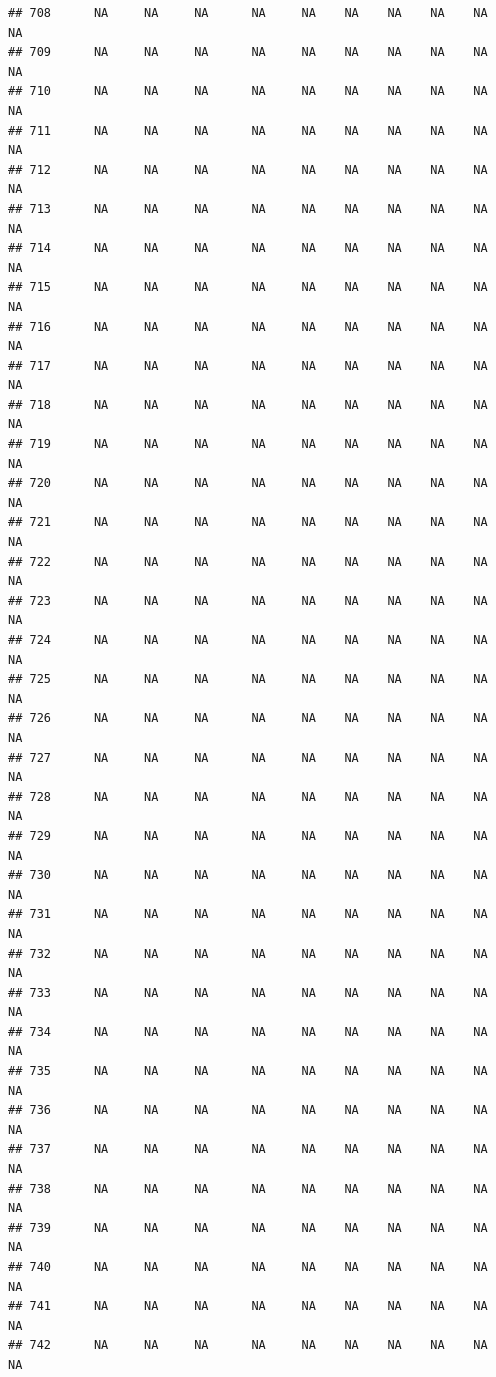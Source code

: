 \documentclass{article}\usepackage{graphicx, color}
\makeatletter
\newenvironment{kframe}{%
 \def\at@end@of@kframe{}%
 \ifinner\ifhmode%
  \def\at@end@of@kframe{\end{minipage}}%
  \begin{minipage}{\columnwidth}%
 \fi\fi%
 \def\FrameCommand##1{\hskip\@totalleftmargin \hskip-\fboxsep
 \colorbox{shadecolor}{##1}\hskip-\fboxsep
     \hskip-\linewidth \hskip-\@totalleftmargin \hskip\columnwidth}%
 \MakeFramed {\advance\hsize-\width
   \@totalleftmargin\z@ \linewidth\hsize
   \@setminipage}}%
 {\par\unskip\endMakeFramed%
 \at@end@of@kframe}
\newenvironment{knitrout}{}{} %
\makeatother
\begin{document}
\begin{knitrout}
\begin{kframe}
\begin{verbatim}
## 708      NA     NA     NA      NA     NA    NA    NA    NA    NA     NA
## 709      NA     NA     NA      NA     NA    NA    NA    NA    NA     NA
## 710      NA     NA     NA      NA     NA    NA    NA    NA    NA     NA
## 711      NA     NA     NA      NA     NA    NA    NA    NA    NA     NA
## 712      NA     NA     NA      NA     NA    NA    NA    NA    NA     NA
## 713      NA     NA     NA      NA     NA    NA    NA    NA    NA     NA
## 714      NA     NA     NA      NA     NA    NA    NA    NA    NA     NA
## 715      NA     NA     NA      NA     NA    NA    NA    NA    NA     NA
## 716      NA     NA     NA      NA     NA    NA    NA    NA    NA     NA
## 717      NA     NA     NA      NA     NA    NA    NA    NA    NA     NA
## 718      NA     NA     NA      NA     NA    NA    NA    NA    NA     NA
## 719      NA     NA     NA      NA     NA    NA    NA    NA    NA     NA
## 720      NA     NA     NA      NA     NA    NA    NA    NA    NA     NA
## 721      NA     NA     NA      NA     NA    NA    NA    NA    NA     NA
## 722      NA     NA     NA      NA     NA    NA    NA    NA    NA     NA
## 723      NA     NA     NA      NA     NA    NA    NA    NA    NA     NA
## 724      NA     NA     NA      NA     NA    NA    NA    NA    NA     NA
## 725      NA     NA     NA      NA     NA    NA    NA    NA    NA     NA
## 726      NA     NA     NA      NA     NA    NA    NA    NA    NA     NA
## 727      NA     NA     NA      NA     NA    NA    NA    NA    NA     NA
## 728      NA     NA     NA      NA     NA    NA    NA    NA    NA     NA
## 729      NA     NA     NA      NA     NA    NA    NA    NA    NA     NA
## 730      NA     NA     NA      NA     NA    NA    NA    NA    NA     NA
## 731      NA     NA     NA      NA     NA    NA    NA    NA    NA     NA
## 732      NA     NA     NA      NA     NA    NA    NA    NA    NA     NA
## 733      NA     NA     NA      NA     NA    NA    NA    NA    NA     NA
## 734      NA     NA     NA      NA     NA    NA    NA    NA    NA     NA
## 735      NA     NA     NA      NA     NA    NA    NA    NA    NA     NA
## 736      NA     NA     NA      NA     NA    NA    NA    NA    NA     NA
## 737      NA     NA     NA      NA     NA    NA    NA    NA    NA     NA
## 738      NA     NA     NA      NA     NA    NA    NA    NA    NA     NA
## 739      NA     NA     NA      NA     NA    NA    NA    NA    NA     NA
## 740      NA     NA     NA      NA     NA    NA    NA    NA    NA     NA
## 741      NA     NA     NA      NA     NA    NA    NA    NA    NA     NA
## 742      NA     NA     NA      NA     NA    NA    NA    NA    NA     NA

\end{verbatim}
\end{kframe}
\end{knitrout}
\end{document}
